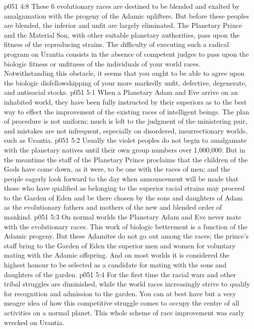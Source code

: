 \vs p051 4:8 These 6 evolutionary races are destined to be blended and exalted by amalgamation with the progeny of the Adamic uplifters. But before these peoples are blended, the inferior and unfit are largely eliminated. The Planetary Prince and the Material Son, with other suitable planetary authorities, pass upon the fitness of the reproducing strains. The difficulty of executing such a radical program on Urantia consists in the absence of competent judges to pass upon the biologic fitness or unfitness of the individuals of your world races. Notwithstanding this obstacle, it seems that you ought to be able to agree upon the biologic disfellowshipping of your more markedly unfit, defective, degenerate, and antisocial stocks.
\vs p051 5:1 When a Planetary Adam and Eve arrive on an inhabited world, they have been fully instructed by their superiors as to the best way to effect the improvement of the existing races of intelligent beings. The plan of procedure is not uniform; much is left to the judgment of the ministering pair, and mistakes are not infrequent, especially on disordered, insurrectionary worlds, such as Urantia.
\vs p051 5:2 Usually the violet peoples do not begin to amalgamate with the planetary natives until their own group numbers over 1,000,000. But in the meantime the staff of the Planetary Prince proclaims that the children of the Gods have come down, as it were, to be one with the races of men; and the people eagerly look forward to the day when announcement will be made that those who have qualified as belonging to the superior racial strains may proceed to the Garden of Eden and be there chosen by the sons and daughters of Adam as the evolutionary fathers and mothers of the new and blended order of mankind.
\vs p051 5:3 On normal worlds the Planetary Adam and Eve never mate with the evolutionary races. This work of biologic betterment is a function of the Adamic progeny. But these Adamites do not go out among the races; the prince’s staff bring to the Garden of Eden the superior men and women for voluntary mating with the Adamic offspring. And on most worlds it is considered the highest honour to be selected as a candidate for mating with the sons and daughters of the garden.
\vs p051 5:4 For the first time the racial wars and other tribal struggles are diminished, while the world races increasingly strive to qualify for recognition and admission to the garden. You can at best have but a very meagre idea of how this competitive struggle comes to occupy the centre of all activities on a normal planet. This whole scheme of race improvement was early wrecked on Urantia.
